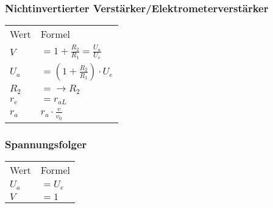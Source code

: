     \subsubsection{Nichtinvertierter Verstärker/Elektrometerverstärker}
        \begin{minipage}{0.6\columnwidth}
            \renewcommand{\arraystretch}{1.1}
            \begin{table}[H]
                \begin{tabularx}{\columnwidth}{l l}
                    Wert  & Formel \\
                    $V$   & $=1+\frac{R_2}{R_1}=\frac{U_a}{U_e}$ \\
                    $U_a$ & $=(1+\frac{R_2}{R_1})\cdot U_e$ \\
                    $R_2$ & $=\longrightarrow R_2$\\
                    $r_e$ & $=r_{aL}$ \\
                    $r_a$ & $r_a\cdot\frac{v}{v_0}$\\
                \end{tabularx}
            \end{table}
        \end{minipage}
        \begin{minipage}{0.4\columnwidth}
        \end{minipage}
    \subsubsection{Spannungsfolger}
        \begin{minipage}{0.6\columnwidth}
            \begin{table}[H]
                \begin{tabularx}{\columnwidth}{l l}
                    Wert  & Formel \\
                    $U_a$ & $=U_e$ \\
                    $V$   & $=1$ \\
                \end{tabularx}
            \end{table}
        \end{minipage}
        \begin{minipage}{0.4\columnwidth}
        \end{minipage}
